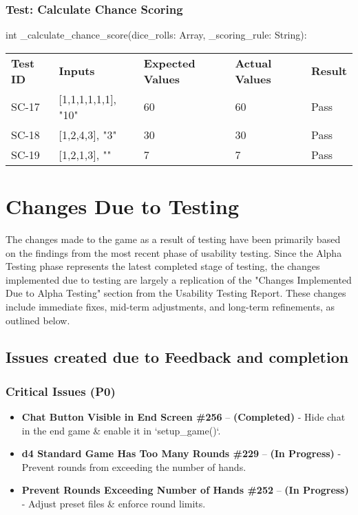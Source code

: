 \documentclass[12pt, titlepage]{article}
\begin{document}
\subsubsection{Test: Calculate Chance Scoring}
int \_calculate\_chance\_score(dice\_rolls: Array, \_scoring\_rule: String):\\
\begin{tabularx}{\textwidth}{|p{2cm}|p{3.5cm}|p{3.5cm}|p{3.0cm}|p{1.5cm}|}
    \cline{1-5}
    \textbf{Test ID} & \textbf{Inputs} & \textbf{Expected Values} & \textbf{Actual Values} & \textbf{Result} \\
    \cline{1-5}
    SC-17 & [1,1,1,1,1,1], "10" & 60 & 60 & Pass \\
    \cline{1-5}
    SC-18 & [1,2,4,3], "3" & 30 & 30 & Pass \\
    \cline{1-5}
    SC-19 & [1,2,1,3], "" & 7 & 7 & Pass \\
    \cline{1-5}
\end{tabularx}

\newpage
\section{Changes Due to Testing}

The changes made to the game as a result of testing have been primarily based on the findings from the most recent phase of usability testing. Since the Alpha Testing phase represents the latest completed stage of testing, the changes implemented due to testing are largely a replication of the "Changes Implemented Due to Alpha Testing" section from the Usability Testing Report. These changes include immediate fixes, mid-term adjustments, and long-term refinements, as outlined below.

\subsection{Issues created due to Feedback and completion}

\subsubsection{Critical Issues (P0)}
\begin{itemize}
    \item \textbf{Chat Button Visible in End Screen \#256} – \textbf{(Completed)} - Hide chat in the end game \& enable it in `setup\_game()`.
    \item \textbf{d4 Standard Game Has Too Many Rounds \#229} – \textbf{(In Progress)} - Prevent rounds from exceeding the number of hands.
    \item \textbf{Prevent Rounds Exceeding Number of Hands \#252} – \textbf{(In Progress)} - Adjust preset files \& enforce round limits.
\end{itemize}
\end{document}
